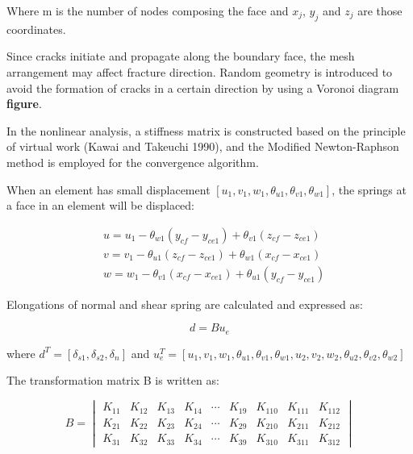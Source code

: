 Where m is the number of nodes composing the face and $x_j$, $y_j$ and $z_j$ are those coordinates.

Since cracks initiate and propagate along the boundary face, the mesh arrangement may affect fracture direction. Random geometry is introduced to avoid the formation of cracks in a certain direction by using a Voronoi diagram
\textbf{figure}.

In the nonlinear analysis, a stiffness matrix is constructed based on the principle of virtual work (Kawai and Takeuchi 1990), and the Modified Newton-Raphson method is employed for the convergence algorithm.

When an element has small displacement $[u_1, v_1, w_1, \theta_{u1}, \theta_{v1}, \theta_{w1}]$, the springs at a face in an element will be displaced:

\begin{equation}
  \begin{aligned}
  &u = u_1 - \theta_{w1} (y_{cf} - y_{ce1}) + \theta_{v1} (z_{cf} - z_{ce1}) \\
  &v = v_1 - \theta_{u1} (z_{cf} - z_{ce1}) + \theta_{w1} (x_{cf} - x_{ce1}) \\
  &w = w_1 - \theta_{v1} (x_{cf} - x_{ce1}) + \theta_{u1} (y_{cf} - y_{ce1})
  \end{aligned}
\end{equation}

Elongations of normal and shear spring are calculated and expressed as:

\begin{equation}
  d = Bu_e
\end{equation}

where $d^T = [\delta_{s1}, \delta_{s2}, \delta_n]$ and $u_e^T = [u_1, v_1, w_1,\theta_{u1}, \theta_{v1}, \theta_{w1}, u_2, v_2, w_2,\theta_{u2}, \theta_{v2}, \theta_{w2}]$

The transformation matrix B is written as:

\begin{equation}
  B =
  \begin{vmatrix}
    K_{11} &K_{12} &K_{13} &K_{14} &{\cdots} &K_{19} &K_{110} &K_{111} &K_{112}\\
    K_{21} &K_{22} &K_{23} &K_{24} &{\cdots} &K_{29} &K_{210} &K_{211} &K_{212}\\
    K_{31} &K_{32} &K_{33} &K_{34} &{\cdots} &K_{39} &K_{310} &K_{311} &K_{312}
  \end{vmatrix}
\end{equation}

